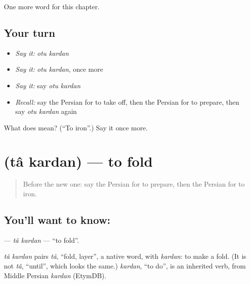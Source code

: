 \begin{grammarlens}[title={What you've built}]
One more word for this chapter.
\end{grammarlens}

\subsection*{Your turn}
\begin{itemize}
\raggedright
  \item \emph{Say it:} \emph{otu kardan}
  \item \emph{Say it:} \emph{otu kardan}, once more
  \item \emph{Say it:} say \emph{otu kardan}
  \item \emph{Recall:} say the Persian for to take off, then the Persian for to prepare, then say \emph{otu kardan} again
\end{itemize}

\begin{tcolorbox}[breakable,colback=teal!4,colframe=teal!35!black,title={Before you move on}]
What does   mean? (\textquotedblleft{}To iron\textquotedblright{}.) Say it once more.
\end{tcolorbox}
\section[\texorpdfstring{\fa{تا} \fa{کردن} (tâ kardan)}{تا کردن (tâ kardan)}]{  (tâ kardan) — to fold}

\label{lesson:FA-C254-ta-kardan}



\begin{quote}
Before the new one: say the Persian for to prepare, then the Persian for to iron.
\end{quote}

\subsection*{You'll want to know:  }
\textbf{ } — \emph{tâ kardan} — \textquotedblleft{}to fold\textquotedblright{}.

\begin{cousinweb}
\emph{tâ kardan} pairs \emph{tâ}, \textquotedblleft{}fold, layer\textquotedblright{}, a native word, with \emph{kardan}: to make a fold. (It is not \emph{tâ}, \textquotedblleft{}until\textquotedblright{}, which looks the same.) \emph{kardan}, \textquotedblleft{}to do\textquotedblright{}, is an inherited verb, from Middle Persian \emph{kardan} (EtymDB).
\end{cousinweb}

